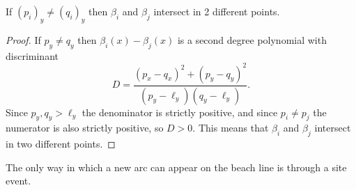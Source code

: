 \begin{lem} \label{highschoollemma}
If $(p_i)_y \ne (q_i)_y$ then $\beta_i$ and $\beta_j$ intersect in 2 different points.
\end{lem}
\begin{proof}
If $p_y \ne q_y$ then $\beta_i(x) - \beta_j(x)$ is a second degree polynomial with discriminant
\begin{equation}
    D = \frac{(p_x - q_x)^2 + (p_y - q_y)^2}{(p_y - \ell_y)(q_y - \ell_y)}.
\end{equation}
Since $p_y, q_y > \ell_y$ the denominator is strictly positive, and since $p_i \ne p_j$ the numerator is also strictly positive, so $D > 0$. This means that $\beta_i$ and $\beta_j$ intersect in two different points.
\end{proof}

\begin{lem}
The only way in which a new arc can appear on the beach line is through a site event.
\end{lem}
